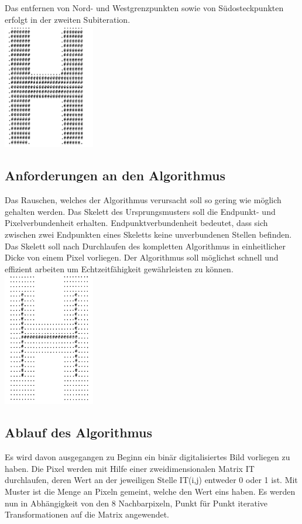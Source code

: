 Das entfernen von Nord- und Westgrenzpunkten sowie von Südosteckpunkten erfolgt in der zweiten Subiteration.\\

\includegraphics[width=4cm]{Res/NordWest.png}

\subsection{Anforderungen an den Algorithmus}

Das Rauschen, welches der Algorithmus verursacht soll so gering wie möglich gehalten werden.
Das Skelett des Ursprungsmusters soll die Endpunkt- und Pixelverbundenheit erhalten.
Endpunktverbundenheit bedeutet, dass sich zwischen zwei Endpunkten eines Skeletts keine unverbundenen Stellen befinden.
Das Skelett soll nach Durchlaufen des kompletten Algorithmus in einheitlicher Dicke von einem Pixel vorliegen.
Der Algorithmus soll möglichst schnell und effizient arbeiten um Echtzeitfähigkeit gewährleisten zu können.\\


\includegraphics[width=4cm]{Res/Skelett.png}

\subsection{Ablauf des Algorithmus}

Es wird davon ausgegangen zu Beginn ein binär digitalisiertes Bild vorliegen zu haben.
Die Pixel werden mit Hilfe einer zweidimensionalen Matrix IT durchlaufen, deren Wert an der jeweiligen Stelle IT(i,j) entweder 0 oder 1 ist.
Mit Muster ist die Menge an Pixeln gemeint, welche den Wert eins haben.
Es werden nun in Abhängigkeit von den 8 Nachbarpixeln, Punkt für Punkt iterative Transformationen auf die Matrix angewendet.

